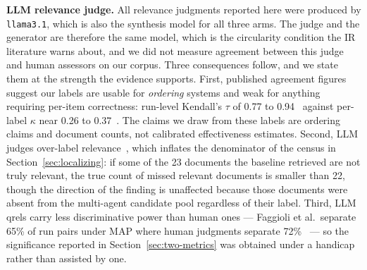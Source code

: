 \documentclass[acmsmall,review,anonymous,screen]{acmart}
\begin{document}
\textbf{LLM relevance judge.}
All relevance judgments reported here were produced by \texttt{llama3.1}, which
is also the synthesis model for all three arms. The judge and the generator are
therefore the same model, which is the circularity condition the IR literature
warns about, and we did not measure agreement between this judge and human
assessors on our corpus. Three consequences follow, and we state them at the
strength the evidence supports. First, published agreement figures suggest our
labels are usable for \emph{ordering} systems and weak for anything requiring
per-item correctness: run-level Kendall's $\tau$ of 0.77 to
0.94~\cite{upadhyay2024umbrela,thomas2024preferences} against per-label
$\kappa$ near 0.26 to 0.37~\cite{upadhyay2024umbrela,faggioli2023perspectives}.
The claims we draw from these labels are ordering claims and document counts,
not calibrated effectiveness estimates. Second, LLM judges over-label
relevance~\cite{alaofi2024fooled}, which inflates the denominator of the
census in Section~\ref{sec:localizing}: if some of the 23 documents the baseline
retrieved are not truly relevant, the true count of missed relevant documents is
smaller than 22, though the direction of the finding is unaffected because those
documents were absent from the multi-agent candidate pool regardless of their
label. Third, LLM qrels carry less discriminative power than human ones ---
Faggioli et al.\ separate 65\% of run pairs under MAP where human judgments
separate 72\%~\cite{faggioli2023perspectives} --- so the significance reported
in Section~\ref{sec:two-metrics} was obtained under a handicap rather than
assisted by one.
\end{document}
